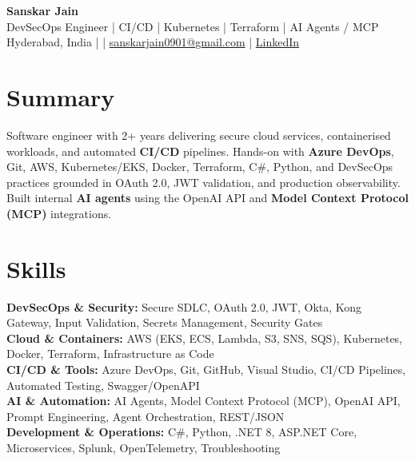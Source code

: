 \documentclass[10pt,letterpaper]{article}
\begin{document}
\begin{center}
    {\Large \textbf{Sanskar Jain}} \\
    DevSecOps Engineer \;|\; CI/CD \;|\; Kubernetes \;|\; Terraform \;|\; AI Agents / MCP \\
    Hyderabad, India \enspace |  \enspace | \enspace
    \href{mailto:sanskarjain0901@gmail.com}{sanskarjain0901@gmail.com} \enspace | \enspace
    \href{https://www.linkedin.com/in/sanskar-jain0901/}{LinkedIn}
\end{center}

\vspace{2pt}

\section*{Summary}
Software engineer with 2+ years delivering secure cloud services, containerised workloads, and automated \textbf{CI/CD} pipelines. Hands-on with \textbf{Azure DevOps}, Git, AWS, Kubernetes/EKS, Docker, Terraform, C\#, Python, and DevSecOps practices grounded in OAuth 2.0, JWT validation, and production observability. Built internal \textbf{AI agents} using the OpenAI API and \textbf{Model Context Protocol (MCP)} integrations.

\section*{Skills}
\textbf{DevSecOps \& Security:} Secure SDLC, OAuth 2.0, JWT, Okta, Kong Gateway, Input Validation, Secrets Management, Security Gates \\
\textbf{Cloud \& Containers:} AWS (EKS, ECS, Lambda, S3, SNS, SQS), Kubernetes, Docker, Terraform, Infrastructure as Code \\
\textbf{CI/CD \& Tools:} Azure DevOps, Git, GitHub, Visual Studio, CI/CD Pipelines, Automated Testing, Swagger/OpenAPI \\
\textbf{AI \& Automation:} AI Agents, Model Context Protocol (MCP), OpenAI API, Prompt Engineering, Agent Orchestration, REST/JSON \\
\textbf{Development \& Operations:} C\#, Python, .NET 8, ASP.NET Core, Microservices, Splunk, OpenTelemetry, Troubleshooting
\end{document}
